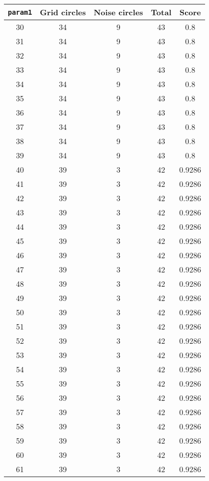 \documentclass[letterpaper, 12pt]{article}
\begin{document}
\begin{longtable}{|c|c|c|c|c|}
\hline
\textbf{\texttt{param1}} & \textbf{Grid circles} & \textbf{Noise circles} & \textbf{Total} & \textbf{Score} \\
\hline
30 & 34 & 9 & 43 & 0.8 \\
\hline
31 & 34 & 9 & 43 & 0.8 \\
\hline
32 & 34 & 9 & 43 & 0.8 \\
\hline
33 & 34 & 9 & 43 & 0.8 \\
\hline
34 & 34 & 9 & 43 & 0.8 \\
\hline
35 & 34 & 9 & 43 & 0.8 \\
\hline
36 & 34 & 9 & 43 & 0.8 \\
\hline
37 & 34 & 9 & 43 & 0.8 \\
\hline
38 & 34 & 9 & 43 & 0.8 \\
\hline
39 & 34 & 9 & 43 & 0.8 \\
\hline
40 & 39 & 3 & 42 & 0.9286 \\
\hline
41 & 39 & 3 & 42 & 0.9286 \\
\hline
42 & 39 & 3 & 42 & 0.9286 \\
\hline
43 & 39 & 3 & 42 & 0.9286 \\
\hline
44 & 39 & 3 & 42 & 0.9286 \\
\hline
45 & 39 & 3 & 42 & 0.9286 \\
\hline
46 & 39 & 3 & 42 & 0.9286 \\
\hline
47 & 39 & 3 & 42 & 0.9286 \\
\hline
48 & 39 & 3 & 42 & 0.9286 \\
\hline
49 & 39 & 3 & 42 & 0.9286 \\
\hline
50 & 39 & 3 & 42 & 0.9286 \\
\hline
51 & 39 & 3 & 42 & 0.9286 \\
\hline
52 & 39 & 3 & 42 & 0.9286 \\
\hline
53 & 39 & 3 & 42 & 0.9286 \\
\hline
54 & 39 & 3 & 42 & 0.9286 \\
\hline
55 & 39 & 3 & 42 & 0.9286 \\
\hline
56 & 39 & 3 & 42 & 0.9286 \\
\hline
57 & 39 & 3 & 42 & 0.9286 \\
\hline
58 & 39 & 3 & 42 & 0.9286 \\
\hline
59 & 39 & 3 & 42 & 0.9286 \\
\hline
60 & 39 & 3 & 42 & 0.9286 \\
\hline
61 & 39 & 3 & 42 & 0.9286 \\

\end{longtable}
\end{document}
